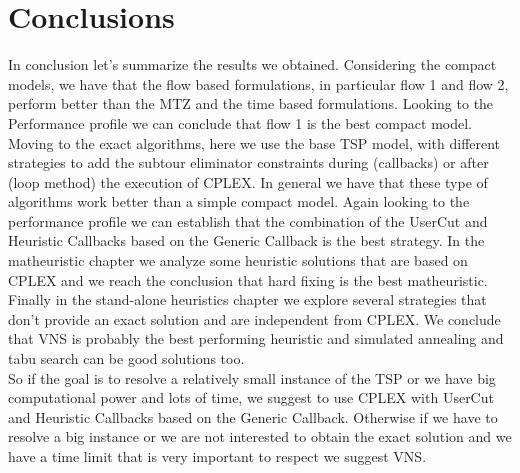 \chapter{Conclusions}
In conclusion let's summarize the results we obtained. Considering the compact models, we have that the flow based formulations, in particular flow 1 and flow 2, perform better than the MTZ and the time based formulations. Looking to the Performance profile we can conclude that flow 1 is the best compact model.
Moving to the exact algorithms, here we use the base TSP model, with different strategies to add the subtour eliminator constraints during (callbacks) or after (loop method) the execution of CPLEX. In general we have that these type of algorithms work better than a simple compact model. Again looking to the performance profile we can establish that the combination of the UserCut and Heuristic Callbacks based on the Generic Callback is the best strategy.
In the matheuristic chapter we analyze some heuristic solutions that are based on CPLEX and we reach the conclusion that hard fixing is the best matheuristic.
Finally in the stand-alone heuristics chapter we explore several strategies that don't provide an exact solution and are independent from CPLEX. We conclude that VNS is probably the best performing heuristic and simulated annealing and tabu search can be good solutions too. \\

\noindent So if the goal is to resolve a relatively small instance of the TSP or we have big computational power and lots of time, we suggest to use CPLEX with UserCut and Heuristic Callbacks based on the Generic Callback. Otherwise if we have to resolve a big instance or we are not interested to obtain the exact solution and we have a time limit that is very important to respect we suggest VNS. 




